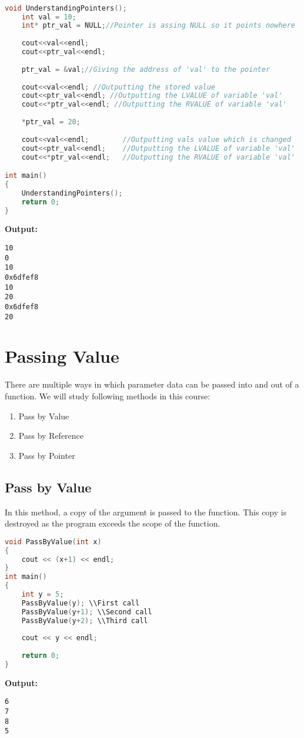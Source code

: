 \documentclass[11pt,fleqn]{book} %
\begin{document}
\begin{example}
\begin{lstlisting}[language=C++, caption = Understanding Pointers]

void UnderstandingPointers();
	int val = 10;
	int* ptr_val = NULL;//Pointer is assing NULL so it points nowhere
	
	cout<<val<<endl;
	cout<<ptr_val<<endl;
	
	ptr_val = &val;//Giving the address of 'val' to the pointer
	
	cout<<val<<endl; //Outputting the stored value
	cout<<ptr_val<<endl; //Outputting the LVALUE of variable 'val'
	cout<<*ptr_val<<endl; //Outputting the RVALUE of variable 'val'
	
	*ptr_val = 20;
	
	cout<<val<<endl;        //Outputting vals value which is changed 
	cout<<ptr_val<<endl;    //Outputting the LVALUE of variable 'val'
	cout<<*ptr_val<<endl;   //Outputting the RVALUE of variable 'val'

int main()
{
	UnderstandingPointers();
	return 0;
}
\end{lstlisting} 
\textbf{Output:}
\begin{lstlisting}
10
0
10
0x6dfef8
10
20
0x6dfef8
20
\end{lstlisting}

\end{example}

\section{Passing Value}
There are multiple ways in which parameter data can be passed into and out of a function. We will study following methods in this course:
\begin{enumerate}
	\item Pass by Value
	\item Pass by Reference
	\item Pass by Pointer
\end{enumerate}
\subsection{Pass by Value}
In this method, a copy of the argument is passed to the function. This copy is destroyed as the program exceeds the scope of the function.
\begin{lstlisting}[language=C++, caption = Pass by value]
void PassByValue(int x)
{
	cout << (x+1) << endl;
}
int main()
{
	int y = 5;
	PassByValue(y); \\First call
	PassByValue(y+1); \\Second call
	PassByValue(y+2); \\Third call
	
	cout << y << endl;
	
	return 0;
}
\end{lstlisting}
\textbf{Output:}
\begin{lstlisting}
6
7
8
5
\end{lstlisting}
 
\end{document}
